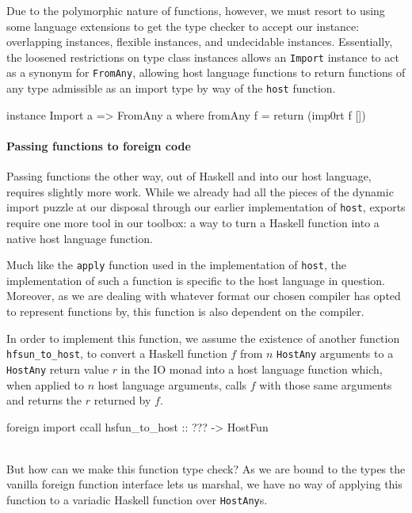\documentclass{sigplanconf}
\begin{document}
Due to the polymorphic nature of functions, however, we must resort to using
some language extensions to get the type checker to accept our instance:
overlapping instances, flexible instances, and undecidable instances.
Essentially, the loosened restrictions on type class instances allows an
\lstinline!Import! instance to act as a synonym for \lstinline!FromAny!,
allowing host language functions to return functions of any type admissible
as an import type by way of the \lstinline!host! function.

\begin{code}
  instance Import a => FromAny a where
    fromAny f = return (imp0rt f [])
\end{code}

\paragraph{Passing functions to foreign code}
Passing functions the other way, out of Haskell and into our host language,
requires slightly more work. While we already had all the pieces of the
dynamic import puzzle at our disposal through our earlier implementation of
\lstinline!host!, exports require one more tool in our toolbox: a way to turn
a Haskell function into a native host language function.

Much like the \lstinline!apply! function used in the implementation of
\lstinline!host!, the implementation of such a function is specific to the
host language in question. Moreover, as we are dealing with whatever format
our chosen compiler has opted to represent functions by, this function is also
dependent on the compiler.

In order to implement this function, we assume the existence of another
function \lstinline!hfsun_to_host!, to convert a Haskell function $f$ from $n$
\lstinline!HostAny! arguments to a \lstinline!HostAny! return value $r$ in the
IO monad into a host language function which, when applied to $n$ host
language arguments, calls $f$ with those same arguments and returns the $r$
returned by $f$.\\
\begin{code}
  foreign import ccall
    hsfun_to_host :: ??? -> HostFun
\end{code}\\
But how can we make this function type check?
As we are bound to the types the vanilla foreign function interface lets us
marshal, we have no way of applying this function to a variadic Haskell
function over \lstinline!HostAny!s.
\end{document}
